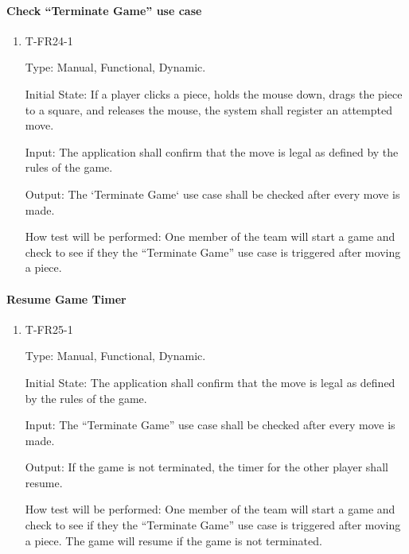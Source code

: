 \documentclass[12pt, titlepage]{article}
\begin{document}
    \paragraph{Check ``Terminate Game'' use case}

        \begin{enumerate}

        \item{T-FR24-1\\}

            Type: Manual, Functional, Dynamic.
            					
            Initial State: If a player clicks a piece, holds the mouse down, drags the piece to a square, and releases the mouse, the system shall register an attempted move.
            					
            Input: The application shall confirm that the move is legal as defined by the rules of the game.
            					
            Output: The ‘Terminate Game‘ use case shall be checked after every move is made.

            How test will be performed: One member of the team will start a game and check to see if they the ``Terminate Game'' use case is triggered after moving a piece.

        \end{enumerate}

    \paragraph{Resume Game Timer}

        \begin{enumerate}

        \item{T-FR25-1\\}

            Type: Manual, Functional, Dynamic.
            					
            Initial State: The application shall confirm that the move is legal as defined by the rules of the game.
            					
            Input: The ``Terminate Game'' use case shall be checked after every move is made.
            					
            Output: If the game is not terminated, the timer for the other player shall resume.

            How test will be performed: One member of the team will start a game and check to see if they the ``Terminate Game'' use case is triggered after moving a piece. The game will resume if the game is not terminated.

        \end{enumerate}
            
\end{document}
